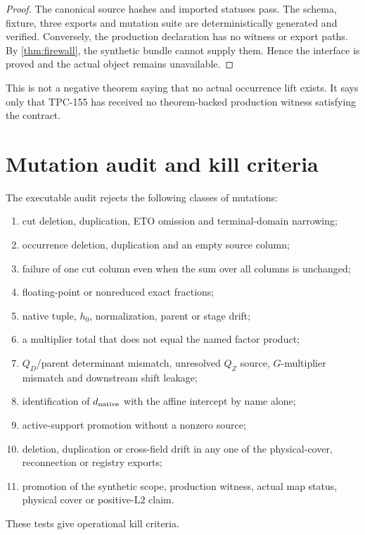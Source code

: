 \documentclass[11pt]{article}
\numberwithin{equation}{section}
\theoremstyle{definition}
\theoremstyle{remark}
\newcommand{\Ltwo}{\mathrm{L2}}
\begin{document}
\begin{proof}
The canonical source hashes and imported statuses pass.  The schema,
fixture, three exports and mutation suite are deterministically
generated and verified.  Conversely, the production declaration has
no witness or export paths.  By \cref{thm:firewall}, the synthetic
bundle cannot supply them.  Hence the interface is proved and the
actual object remains unavailable.
\end{proof}

This is not a negative theorem saying that no actual occurrence lift
exists.  It says only that TPC-155 has received no theorem-backed
production witness satisfying the contract.

\section{Mutation audit and kill criteria}

The executable audit rejects the following classes of mutations:
\begin{enumerate}[leftmargin=2em]
\item cut deletion, duplication, ETO omission and terminal-domain
  narrowing;
\item occurrence deletion, duplication and an empty source column;
\item failure of one cut column even when the sum over all columns is
  unchanged;
\item floating-point or nonreduced exact fractions;
\item native tuple, \(h_0\), normalization, parent or stage drift;
\item a multiplier total that does not equal the named factor product;
\item \(Q_D\)/parent determinant mismatch, unresolved \(Q_Z\) source,
  \(G\)-multiplier mismatch and downstream shift leakage;
\item identification of \(d_{\rm native}\) with the affine intercept
  by name alone;
\item active-support promotion without a nonzero source;
\item deletion, duplication or cross-field drift in any one of the
  physical-cover, reconnection or registry exports;
\item promotion of the synthetic scope, production witness, actual
  map status, physical cover or positive-\(\Ltwo\) claim.
\end{enumerate}

These tests give operational kill criteria.
\end{document}
